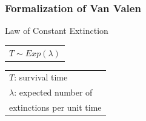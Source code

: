 \documentclass{beamer}
\begin{document}
\begin{frame}
  \frametitle{Formalization of Van Valen}

  \begin{block}{Law of Constant Extinction}
    \begin{center}
      \begin{tabular}{@{}l@{}}\(T \sim Exp(\lambda)\)\end{tabular}
      \hspace{1.5cm}
      \begin{tabular}{@{}l@{}}\(T\): survival time\\\(\lambda\): expected number of \\extinctions per unit time\end{tabular}
    \end{center}
  \end{block}
\end{frame}
\end{document}
